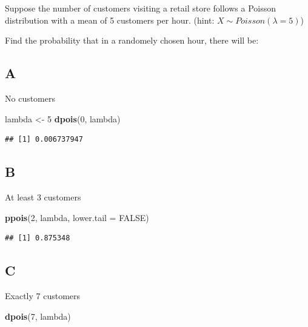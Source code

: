 \documentclass[
]{article}
\newenvironment{Shaded}{\begin{snugshade}}{\end{snugshade}}
\newcommand{\DataTypeTok}[1]{\textcolor[rgb]{0.13,0.29,0.53}{#1}}
\newcommand{\DecValTok}[1]{\textcolor[rgb]{0.00,0.00,0.81}{#1}}
\newcommand{\KeywordTok}[1]{\textcolor[rgb]{0.13,0.29,0.53}{\textbf{#1}}}
\newcommand{\NormalTok}[1]{#1}
\newcommand{\OtherTok}[1]{\textcolor[rgb]{0.56,0.35,0.01}{#1}}
\newcommand{\StringTok}[1]{\textcolor[rgb]{0.31,0.60,0.02}{#1}}
\begin{document}
Suppose the number of customers visiting a retail store follows a
Poisson distribution with a mean of 5 customers per hour. (hint:
\(X \sim Poisson(\lambda=5)\))

Find the probability that in a randomely chosen hour, there will be:

\hypertarget{a-3}{%
\subsection{A}\label{a-3}}

No customers

\begin{Shaded}
\begin{Highlighting}[]
\NormalTok{lambda \textless{}{-}}\StringTok{ }\DecValTok{5}
\KeywordTok{dpois}\NormalTok{(}\DecValTok{0}\NormalTok{, lambda)}
\end{Highlighting}
\end{Shaded}

\begin{verbatim}
## [1] 0.006737947
\end{verbatim}

\hypertarget{b-3}{%
\subsection{B}\label{b-3}}

At least 3 customers

\begin{Shaded}
\begin{Highlighting}[]
\KeywordTok{ppois}\NormalTok{(}\DecValTok{2}\NormalTok{, lambda, }\DataTypeTok{lower.tail =} \OtherTok{FALSE}\NormalTok{)}
\end{Highlighting}
\end{Shaded}

\begin{verbatim}
## [1] 0.875348
\end{verbatim}

\hypertarget{c-1}{%
\subsection{C}\label{c-1}}

Exactly 7 customers

\begin{Shaded}
\begin{Highlighting}[]
\KeywordTok{dpois}\NormalTok{(}\DecValTok{7}\NormalTok{, lambda)}
\end{Highlighting}
\end{Shaded}
\end{document}
